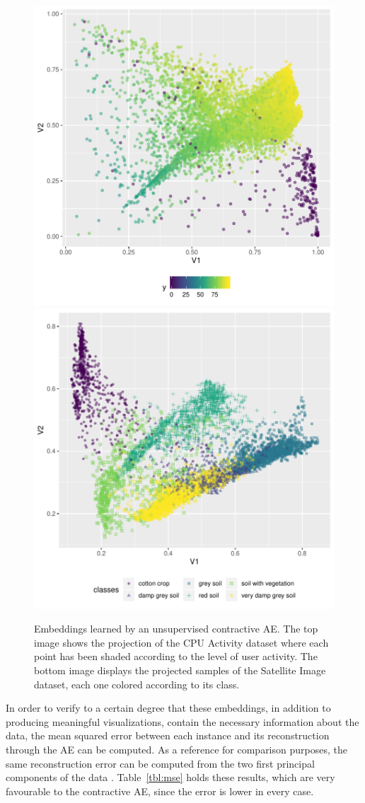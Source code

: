 \begin{figure}[ht!]
    \centering
\includegraphics[width=.49\linewidth]{visualization_cpu}\hfill
\includegraphics[width=.49\linewidth]{visualization_sat2}
    \caption[Embeddings learned by an unsupervised contractive AE.]{Embeddings learned by an unsupervised contractive AE. The top image shows the projection of the CPU Activity dataset where each point has been shaded according to the level of user activity. The bottom image displays the projected samples of the Satellite Image dataset, each one colored according to its class. }
    \label{fig:visualizations}
\end{figure}

In order to verify to a certain degree that these embeddings, in addition to producing meaningful visualizations,  contain the necessary information about the data, the mean squared error between each instance and its reconstruction through the AE can be computed. As a reference for comparison purposes, the same reconstruction error can be computed from the two first principal components of the data . Table~\ref{tbl:mse} holds these results, which are very favourable to the contractive AE, since the error is lower in every case. 


